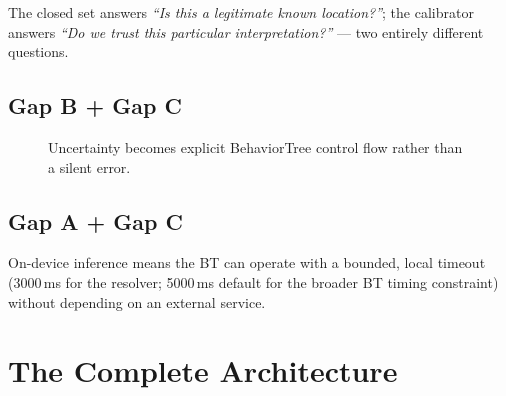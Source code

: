 \documentclass[11pt,a4paper]{article}
\begin{document}
The closed set answers \emph{``Is this a legitimate known location?''}; the
calibrator answers \emph{``Do we trust this particular interpretation?''} ---
two entirely different questions.

\subsection{Gap B + Gap C}

\begin{figure}[h]
\centering
{}
\caption{Uncertainty becomes explicit BehaviorTree control flow rather than a silent error.}
\end{figure}

\subsection{Gap A + Gap C}

On-device inference means the BT can operate with a bounded, local timeout
(3000\,ms for the resolver; 5000\,ms default for the broader BT timing
constraint) without depending on an external service.

\section{The Complete Architecture}
\label{sec:complete}
\end{document}
